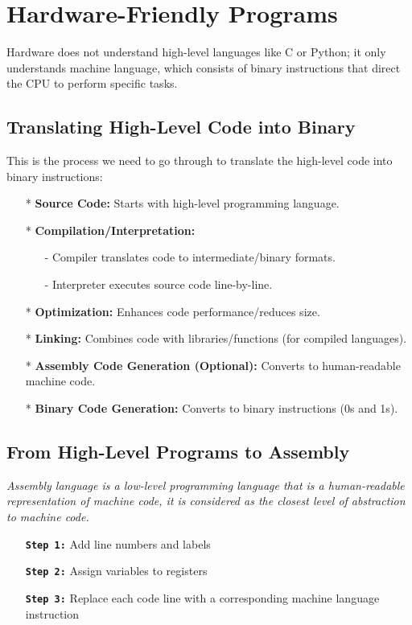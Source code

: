\documentclass[12pt,openany]{book}
\begin{document}
\section{Hardware-Friendly Programs}

\begin{justify}
	Hardware does not understand high-level languages like C or Python; it only understands machine language, which consists of binary instructions that direct the CPU to perform specific tasks.
\end{justify}
\subsection{Translating High-Level Code into Binary}
This is the process we need to go through to translate the high-level code into binary instructions:
\begin{itemize}
    \item[*] \textbf{Source Code:} Starts with high-level programming language.
    \item[*] \textbf{Compilation/Interpretation:}
    \begin{itemize}
        \item[-] Compiler translates code to intermediate/binary formats.
        \item[-] Interpreter executes source code line-by-line.
    \end{itemize}
    \item[*] \textbf{Optimization:} Enhances code performance/reduces size.
    \item[*] \textbf{Linking:} Combines code with libraries/functions (for compiled languages).
    \item[*] \textbf{Assembly Code Generation (Optional):} Converts to human-readable machine code.
    \item[*] \textbf{Binary Code Generation:} Converts to binary instructions (0s and 1s).
\end{itemize}
\subsection{From High-Level Programs to Assembly}
\textit{Assembly language is a low-level programming language that is a human-readable representation of machine code, it is considered as the closest level of abstraction to machine code.}
\begin{itemize}
	\item[] \textbf{\texttt{Step 1:}} Add line numbers and labels
	\item[] \textbf{\texttt{Step 2:}} Assign variables to registers
	\item[] \textbf{\texttt{Step 3:}} Replace each code line with a corresponding machine language instruction
\end{itemize}
\end{document}
